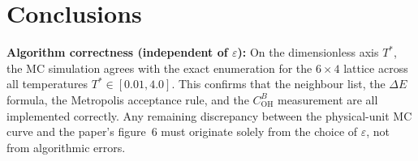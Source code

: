 \documentclass[12pt, a4paper]{article}
\theoremstyle{plain}
\theoremstyle{definition}
\newcommand{\COH}{C_\mathrm{OH}^B}
\newcommand{\eps}{\varepsilon}
\newcommand{\Tstar}{T^*}
\newcommand{\avgE}[1]{\langle #1 \rangle}
\begin{document}




\section{Conclusions}

\begin{conclusion}
\textbf{Algorithm correctness (independent of $\eps$):}
On the dimensionless axis $\Tstar$, the MC simulation agrees
with the exact enumeration for the $6\times4$ lattice across
all temperatures $\Tstar \in [0.01, 4.0]$.
This confirms that the neighbour list, the $\Delta E$ formula,
the Metropolis acceptance rule, and the $\COH$ measurement
are all implemented correctly.
Any remaining discrepancy between the physical-unit MC curve
and the paper's figure~6 must originate solely from the choice
of $\eps$, not from algorithmic errors.
\end{conclusion}
\end{document}
